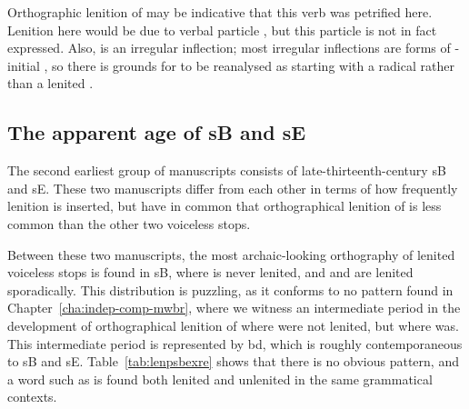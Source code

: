Orthographic lenition of  may be indicative that this verb was petrified here. Lenition here would be due to verbal particle , but this particle is not in fact expressed. Also,  is an irregular inflection; most irregular inflections are forms of -initial , so there is grounds for  to be reanalysed as starting with a radical  rather than a lenited .

\subsection{The apparent age of \gls{sB} and \gls{sE}}
\label{sec:apparent-age-glssb}
The second earliest group of manuscripts consists of late-thirteenth-century \gls{sB} and \gls{sE}. These two manuscripts differ from each other in terms of how frequently lenition is inserted, but have in common that orthographical lenition of  is less common than the other two voiceless stops.

Between these two manuscripts, the most archaic-looking orthography of lenited voiceless stops is found in \gls{sB}, where  is never lenited, and  and  are lenited sporadically. This distribution is puzzling, as it conforms to no pattern found in Chapter~\ref{cha:indep-comp-mwbr}, where we witness an intermediate period in the development of orthographical lenition of  where  were not lenited, but where  was. This intermediate period is represented by \gls{bd}, which is roughly contemporaneous to \gls{sB} and \gls{sE}. Table~\ref{tab:lenpsbexre} shows that there is no obvious pattern, and a word such as  is found both lenited and unlenited in the same grammatical contexts.

